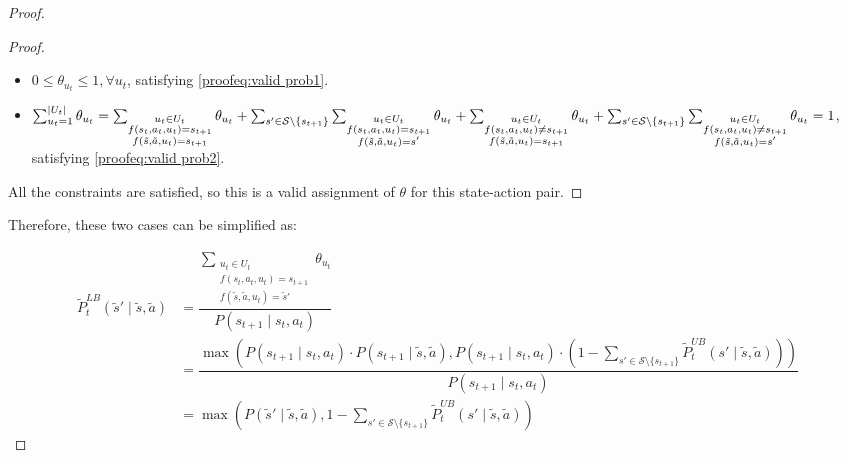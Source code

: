 \begin{proof}
\begin{proof}
\begin{itemize}
    \item $0 \leq \theta_{u_t} \leq 1, \forall u_t$, satisfying \eqref{proofeq:valid prob1}.
    
    \item $\sum_{u_t = 1}^{|U_t|} \theta_{u_t} = \sum_{\substack{u_t \in U_t \\f(s_t, a_t, u_t) = s_{t+1} \\ f(\tilde{s}, \tilde{a}, u_t) = s_{t+1}}} \theta_{u_t} +  \sum_{s' \in \mathcal{S}\setminus\{ s_{t+1}\}}\sum_{\substack{u_t \in U_t \\f(s_t, a_t, u_t) = s_{t+1} \\ f(\tilde{s}, \tilde{a}, u_t) = s'}}{\theta_{u_t}} + \sum_{\substack{u_t \in U_t \\f(s_t, a_t, u_t) \neq s_{t+1} \\ f(\tilde{s}, \tilde{a}, u_t) = s_{t+1}}} \theta_{u_t} \\+ \sum_{s' \in \mathcal{S}\setminus\{ s_{t+1}\}}\sum_{\substack{u_t \in U_t \\f(s_t, a_t, u_t) \neq s_{t+1} \\ f(\tilde{s}, \tilde{a}, u_t) = s'}}{\theta_{u_t}} = 1$, satisfying \eqref{proofeq:valid prob2}.
\end{itemize}

All the constraints are satisfied, so this is a valid assignment of $\theta$ for this state-action pair.
\end{proof}

Therefore, these two cases can be simplified as:

\begin{align*}
\tilde{P}_{t}^{LB}(\tilde{s}' \mid \tilde{s}, \tilde{a}) &= \dfrac{\sum_{\substack{u_t \in U_t \\f(s_t, a_t, u_t) = s_{t+1} \\ f(\tilde{s}, \tilde{a}, u_t) = \tilde{s}'}}{\theta_{u_t}}}{P(s_{t+1} \mid s_t, a_t)}\\ &=
\dfrac{\max\left(P(s_{t+1} \mid s_t, a_t) \cdot P(s_{t+1} \mid \tilde{s}, \tilde{a}), P(s_{t+1} \mid s_t, a_t) \cdot (1 - \sum_{s' \in \mathcal{S}\setminus\{s_{t+1}\}}{\tilde{P}_{t}^{UB}(s' \mid \tilde{s}, \tilde{a})})\right)}{P(s_{t+1} \mid s_t, a_t)}\\ &= \max\left(P(\tilde{s}' \mid \tilde{s}, \tilde{a}), 1 - \sum_{s' \in \mathcal{S}\setminus\{s_{t+1}\}}{\tilde{P}_{t}^{UB}(s' \mid \tilde{s}, \tilde{a})}\right)
\end{align*}
\end{proof}